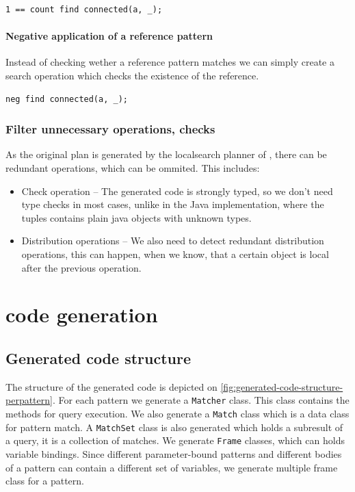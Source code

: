 \begin{lstlisting}[language = vql]
1 == count find connected(a, _);
\end{lstlisting}


\paragraph{Negative application of a reference pattern}
Instead of checking wether a reference pattern matches we can simply create a search operation which checks the existence of the reference.
\begin{lstlisting}[language = vql]
neg find connected(a, _);
\end{lstlisting}



\subsubsection{Filter unnecessary operations, checks}
As the original plan is generated by the localsearch planner of \viatra{}, there can be redundant operations, which can be ommited. This includes:

\begin{itemize}
	\item Check operation -- The generated code is strongly typed, so we don't need type checks in most cases, unlike in the Java implementation, where the tuples contains plain java objects with unknown types.
	
	\item Distribution operations -- We also need to detect redundant distribution operations, this can happen, when we know, that a certain object is local after the previous operation.
\end{itemize}



\section{\protect\cpptt{} code generation}



\subsection{Generated code structure}

The structure of the generated code is depicted on \autoref{fig:generated-code-structure-perpattern}.
For each pattern we generate a \texttt{Matcher} class.
This class contains the methods for query execution.
We also generate a \texttt{Match} class which is a data class for pattern match.
A \texttt{MatchSet} class is also generated which holds a subresult of a query, it is a collection of matches.
We generate \texttt{Frame} classes, which can holds variable bindings. 
Since different parameter-bound patterns and different bodies of a pattern can contain a different set of variables, we generate multiple frame class for a pattern.


